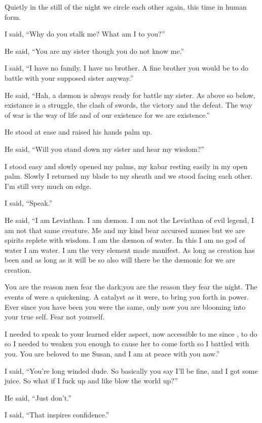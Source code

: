 \lettrine[lines=2,lraise=0]{Q}\space uietly in the still of the night we circle each other again, this time in human form.

I said, ``Why do you stalk me? What am I to you?''

He said, ``You are my sister though you do not know me.''

I said, ``I have no family. I have no brother. A fine brother you would be to do battle with your supposed sister anyway.''

He said, ``Hah, a d\ae mon is always ready for battle my sister. As above so below, existance is a struggle, the clash of swords, the victory and the defeat. The way of war is the way of life and of our existence for we are existence.''

He stood at ease and raised his hands palm up.

He said, ``Will you stand down my sister and hear my wisdom?''

I stood easy and slowly opened my palms, my kabar resting easily in my open palm. Slowly I returned my blade to my sheath and we stood facing each other. I'm still very much on edge.

I said, ``Speak.''

He said, ``I am Leviathan. I am d\ae mon. I am not the Leviathan of evil legend, I am not that same creature. Me and my kind bear accursed names but we are spirits replete with wisdom. I am the d\ae mon of water. In this I am no god of water I am water. I am the very element made manifest. As long as creation has been and as long as it will be so also will there be the d\ae monic for we are creation. 

You are the reason men fear the dark;you are the reason they fear the night. The events of \chichenitza* were a quickening. A catalyst as it were, to bring you forth in power. Ever since you have been you were the same, only now you are blooming into your true self. Fear not yourself.

I needed to speak to your learned elder aspect, now accessible to me since \chichenitza*, to do so I needed to weaken you enough to cause her to come forth so I battled with you. You are beloved to me Susan, and I am at peace with you now.''

I said, ``You're long winded dude. So basically you say I'll be fine, and I got some juice. So what if I fuck up and like blow the world up?''

He said, ``Just don't.''

I said, ``That inspires confidence.''

